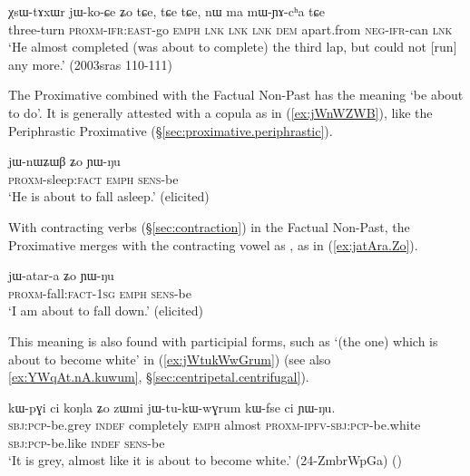 \begin{exe}
\ex \label{ex:XsWtAxWr.jikoCe}
\gll  χsɯ-tɤxɯr jɯ-ko-ɕe ʑo tɕe,  tɕe tɕe, nɯ ma mɯ-ɲɤ-cʰa tɕe \\
three-turn \textsc{proxm}-\textsc{ifr}:\textsc{east}-go \textsc{emph} \textsc{lnk} \textsc{lnk} \textsc{lnk} \textsc{dem} apart.from \textsc{neg}-\textsc{ifr}-can \textsc{lnk} \\
\glt `He almost completed (was about to complete) the third lap, but could not [run] any more.' (2003sras 110-111)
\end{exe}

The Proximative combined with the Factual Non-Past has the meaning `be about to do'. It is generally attested with a copula as in (\ref{ex:jWnWZWB}), like the Periphrastic Proximative (§\ref{sec:proximative.periphrastic}). 

\begin{exe}
\ex \label{ex:jWnWZWB}
\gll jɯ-nɯʑɯβ ʑo ɲɯ-ŋu \\
\textsc{proxm}-sleep:\textsc{fact} \textsc{emph} \textsc{sens}-be \\
\glt `He is about to fall asleep.' (elicited)
\end{exe}

With contracting verbs (§\ref{sec:contraction}) in the Factual Non-Past, the Proximative merges with the contracting vowel as , as in (\ref{ex:jatAra.Zo}).

\begin{exe}
\ex \label{ex:jatAra.Zo}
\gll jɯ-atar-a ʑo ɲɯ-ŋu \\
\textsc{proxm}-fall:\textsc{fact}-\textsc{1sg} \textsc{emph} \textsc{sens}-be \\
\glt `I am about to fall down.' (elicited)
\end{exe}


This meaning is also found with participial forms, such as  `(the one) which is about to become white' in (\ref{ex:jWtukWwGrum}) (see also \ref {ex:YWqAt.nA.kuwum}, §\ref{sec:centripetal.centrifugal}).
 
 \begin{exe} 
\ex \label{ex:jWtukWwGrum}
\gll  kɯ-pɣi ci koŋla ʑo zɯmi jɯ-tu-kɯ-wɣrum kɯ-fse ci ɲɯ-ŋu.  \\
\textsc{sbj}:\textsc{pcp}-be.grey \textsc{indef} completely \textsc{emph} almost \textsc{proxm}-\textsc{ipfv}-\textsc{sbj}:\textsc{pcp}-be.white \textsc{sbj}:\textsc{pcp}-be.like \textsc{indef} \textsc{sens}-be \\
\glt `It is grey, almost like it is about to become white.'  (24-ZmbrWpGa)
()
\end{exe}

